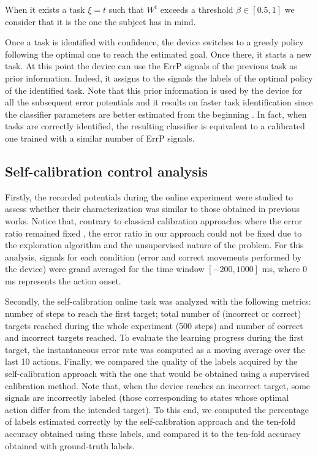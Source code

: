 When it exists a task $\xi=t$ such that $W^{t}$ exceeds a threshold $\beta \in [0.5,1]$ we consider that it is the one the subject has in mind.

Once a task is identified with confidence, the device switches to a greedy policy following the optimal one to reach the estimated goal. Once there, it starts a new task. At this point the device can use the ErrP signals of the previous task as prior information. Indeed, it assigns to the signals the labels of the optimal policy of the identified task.  Note that this prior information is used by the device for all the subsequent error potentials and it results on faster task identification since the classifier parameters are better estimated from the beginning \cite{grizou2014interactive}. In fact, when tasks are correctly identified, the resulting classifier is equivalent to a calibrated one trained with a similar number of ErrP signals.

\subsection{Self-calibration control analysis}

Firstly, the recorded potentials during the online experiment were studied to assess whether their characterization was similar to those obtained in previous works. Notice that, contrary to classical calibration approaches where the error ratio remained fixed \cite{chavarriaga2010learning, iturrate13}, the error ratio in our approach could not be fixed due to the exploration algorithm and the unsupervised nature of the problem. For this analysis, signals for each condition (error and correct movements performed by the device) were grand averaged for the time window $[-200, 1000]$ ms, where 0 ms represents the action onset.

Secondly, the self-calibration online task was analyzed with the following metrics: number of steps to reach the first target; total number of (incorrect or correct) targets reached during the whole experiment (500 steps) and number of correct and incorrect targets reached. To evaluate the learning progress during the first target,  the instantaneous error rate was computed as a moving average over the last 10 actions. Finally, we compared the quality of the labels acquired by the self-calibration approach with the one that would be obtained using a supervised calibration method. Note that, when the device reaches an incorrect target, some signals are incorrectly labeled (those corresponding to states whose optimal action differ from the intended target). To this end, we computed the percentage of labels estimated correctly by the self-calibration approach and the ten-fold accuracy obtained using these labels, and compared it to the ten-fold accuracy obtained with ground-truth labels.

